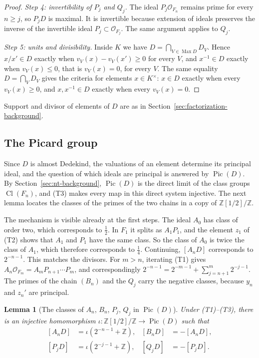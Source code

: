 \documentclass[11pt]{article}
\theoremstyle{plain}
\newtheorem{lemma}[theorem]{Lemma}
\theoremstyle{definition}
\theoremstyle{remark}
\DeclareMathOperator{\Pic}{Pic}
\DeclareMathOperator{\Cl}{Cl}
\DeclareMathOperator{\Max}{Max}
\newcommand{\Z}{\mathbb Z}
\newcommand{\OO}{\mathcal O}
\begin{document}
\begin{proof}
\emph{Step 4: invertibility of $P_j$ and $Q_j$.}  The ideal $P_j\OO_{F_n}$
remains prime for every $n\geq j$, so $P_jD$ is maximal.  It is invertible
because extension of ideals preserves the inverse of the invertible ideal
$P_j\subset\OO_{F_j}$.  The same argument applies to $Q_j$.

\emph{Step 5: units and divisibility.}  Inside $K$ we have
$D=\bigcap_{V\in\Max D}D_V$.  Hence $x/x'\in D$ exactly when
$v_V(x)-v_V(x')\geq0$ for every $V$, and $x^{-1}\in D$ exactly when
$v_V(x)\leq0$, that is $v_V(x)=0$, for every $V$.  The same equality
$D=\bigcap_VD_V$ gives the criteria for elements $x\in K^\times$: $x\in D$
exactly when every $v_V(x)\geq0$, and $x,x^{-1}\in D$ exactly when every
$v_V(x)=0$.
\end{proof}

Support and divisor of elements of $D$ are as in
Section~\ref{sec:factorization-background}.

\subsection{The Picard group}\label{sec:picard}

Since $D$ is almost Dedekind, the valuations of an element determine its
principal ideal, and the question of which ideals are principal is
answered by $\Pic(D)$.  By Section~\ref{sec:nt-background}, $\Pic(D)$ is the
direct limit of the class groups $\Cl(F_n)$, and (T3) makes every map in
this direct system injective.  The next lemma locates the classes of the
primes of the two chains in a copy of $\Z[1/2]/\Z$.

The mechanism is visible already at the first steps.  The ideal $A_0$ has
class of order two, which corresponds to $\tfrac12$.  In $F_1$ it splits
as $A_1P_1$, and the element $z_1$ of (T2) shows that $A_1$ and $P_1$ have
the same class.  So the class of $A_0$ is twice the class of $A_1$, which
therefore corresponds to $\tfrac14$.  Continuing, $[A_nD]$ corresponds to
$2^{-n-1}$.  This matches the divisors.  For $m>n$, iterating (T1) gives
$A_n\OO_{F_m}=A_mP_{n+1}\cdots P_m$, and correspondingly
$2^{-n-1}=2^{-m-1}+\sum_{j=n+1}^{m}2^{-j-1}$.  The primes of the chain
$(B_n)$ and the $Q_j$ carry the negative classes, because $y_n$ and $z_n'$
are principal.

\begin{lemma}[The classes of $A_n$, $B_n$, $P_j$, $Q_j$ in $\Pic(D)$]\label{lem:classes}
Under \textup{(T1)--(T3)}, there is an injective homomorphism
$\iota:\Z[1/2]/\Z\longrightarrow\Pic(D)$ such that
\begin{equation}\label{eq:classes}
\begin{aligned}
 [A_nD]&=\iota(2^{-n-1}+\Z),&[B_nD]&=-[A_nD],\\
 [P_jD]&=\iota(2^{-j-1}+\Z),&[Q_jD]&=-[P_jD].
\end{aligned}
\end{equation}
\end{lemma}
\end{document}
